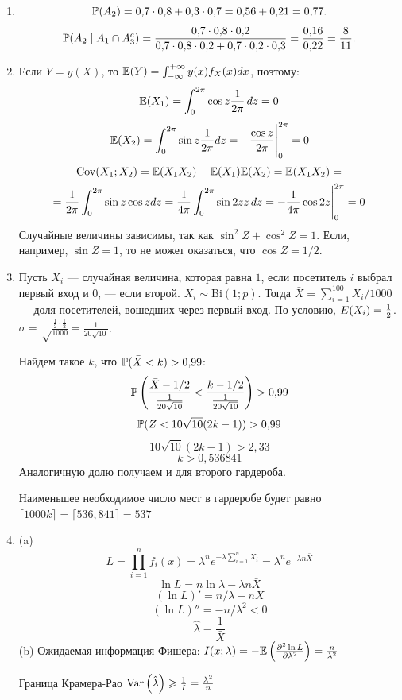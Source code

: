 \documentclass[12pt, a4paper]{article}\usepackage[]{graphicx}\usepackage[]{color}
\begin{document}
\begin{enumerate}
\item
\[
  \P(A_2)=0{,}7\cdot0{,}8+0{,}3\cdot0{,}7=0{,}56+0{,}21=0{,}77.
\]
\[
  \P(A_2 \mid A_1 \cap A_3^c)=
  \frac{0{,}7\cdot0{,}8\cdot0{,}2}{0{,}7\cdot0{,}8\cdot0{,}2+0{,}7\cdot0{,}2\cdot0{,}3}=\frac{0{,}16}{0{,}22}=
  \frac{8}{11}.
\]

\item
Если $Y=y(X)$, то $\E(Y)=\int_{-\infty}^{+\infty}y(x)f_X(x)dx$, поэтому:
$$\E(X_1)=\int_0^{2\pi}\cos z\frac{1}{2\pi} \, dz=0$$
$$\E(X_2)=\int_0^{2\pi}\sin z\frac{1}{2\pi} dz=-\frac{\cos z}{2\pi}\Bigg|^{2\pi}_0=0$$
\begin{multline*}
\Cov(X_1;X_2)=\E(X_1X_2)-\E(X_1)\E(X_2)=\E(X_1X_2)=\\
=\frac{1}{2\pi}\int_0^{2\pi}\sin z \cos zdz=
\frac{1}{4\pi}\int_0^{2\pi}\sin 2z z \,dz = -\frac{1}{4\pi}\cos2z\Bigg|^{2\pi}_0=0
\end{multline*}
Случайные величины зависимы, так как $\sin^2 Z+\cos^2 Z=1$. Если, например, $\sin Z=1$, то не может оказаться, что $\cos Z=1/2$.

\item Пусть $X_i$ — случайная величина, которая равна $1$, если посетитель $i$ выбрал первый вход и $0$, — если второй. $X_i\sim \mathrm{Bi}(1;p)$. Тогда $\bar X=\sum_{i=1}^{100} X_i/1000$ — доля посетителей, вошедших через первый вход. По условию, $\\E(X_i)=\frac{1}{2}$. $\sigma=\sqrt\frac{\frac12\cdot\frac12}{1000}=\frac{1}{20\sqrt{10}}$.

Найдем такое $k$, что $\P(\bar X<k)>0{,}99$:
$$\P\left(\frac{\bar X-1/2}{\frac{1}{20\sqrt{10}}}<\frac{k-1/2}{\frac{1}{20\sqrt{10}}}\right)>0{,}99$$
$$\P(Z<10\sqrt{10}(2k-1))>0{,}99$$
$$10\sqrt{10}(2k-1)>2{,}33$$
$$k>0{,}536841$$
Аналогичную долю получаем и для второго гардероба.

Наименьшее необходимое число мест в гардеробе будет равно $\lceil1000k\rceil=\lceil536{,}841\rceil=537$

\item
(a)
$$L=\prod_{i=1}^nf_i(x)=\lambda^n e^{-\lambda\sum_{i=1}^nX_i}=\lambda^n e^{-\lambda n\bar X}$$
$$\ln L=n\ln\lambda-\lambda n\bar X$$
$$(\ln L)'=n/\lambda-n\bar X$$
$$(\ln L)''=-n/\lambda^2<0$$
$$\hat\lambda=\frac{1}{\bar X}$$
(b) Ожидаемая информация Фишера:
$ I(x;\lambda)=-\E\left(\frac{\partial^2\ln L}{\partial\lambda^2}\right)=\frac{n}{\lambda^2}$


Граница Крамера-Рао $\Var\left(\hat\lambda\right)\ge\frac{1}{I}=\frac{\lambda^2}{n}$



\end{enumerate}
\end{document}
